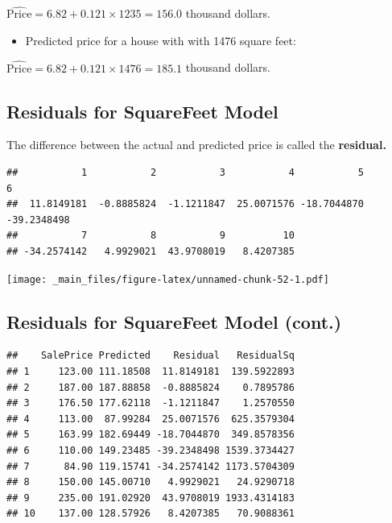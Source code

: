 \documentclass[]{book}
\newenvironment{Shaded}{\begin{snugshade}}{\end{snugshade}}
\newcommand{\OperatorTok}[1]{\textcolor[rgb]{0.81,0.36,0.00}{\textbf{#1}}}
\newcommand{\NormalTok}[1]{#1}
\providecommand{\tightlist}{%
  \setlength{\itemsep}{0pt}\setlength{\parskip}{0pt}}
\begin{document}
\(\widehat{\text{Price}}= 6.82+ 0.121 \times1235 = 156.0\) thousand
dollars.

\begin{itemize}
\tightlist
\item
  Predicted price for a house with with 1476 square feet:
\end{itemize}

\(\widehat{\text{Price}}= 6.82+ 0.121 \times1476 = 185.1\) thousand
dollars.

\subsection{Residuals for SquareFeet
Model}\label{residuals-for-squarefeet-model}

The difference between the actual and predicted price is called the
\textbf{residual.}

\begin{Shaded}
\end{Shaded}

\begin{verbatim}
##           1           2           3           4           5           6 
##  11.8149181  -0.8885824  -1.1211847  25.0071576 -18.7044870 -39.2348498 
##           7           8           9          10 
## -34.2574142   4.9929021  43.9708019   8.4207385
\end{verbatim}

\texttt{[image: \_main\_files/figure-latex/unnamed-chunk-52-1.pdf]}

\subsection{Residuals for SquareFeet Model
(cont.)}\label{residuals-for-squarefeet-model-cont.}

\begin{verbatim}
##    SalePrice Predicted    Residual   ResidualSq
## 1     123.00 111.18508  11.8149181  139.5922893
## 2     187.00 187.88858  -0.8885824    0.7895786
## 3     176.50 177.62118  -1.1211847    1.2570550
## 4     113.00  87.99284  25.0071576  625.3579304
## 5     163.99 182.69449 -18.7044870  349.8578356
## 6     110.00 149.23485 -39.2348498 1539.3734427
## 7      84.90 119.15741 -34.2574142 1173.5704309
## 8     150.00 145.00710   4.9929021   24.9290718
## 9     235.00 191.02920  43.9708019 1933.4314183
## 10    137.00 128.57926   8.4207385   70.9088361
\end{verbatim}
\end{document}
